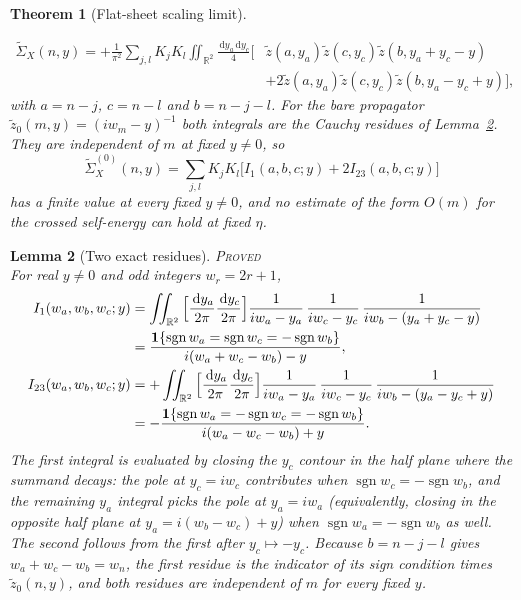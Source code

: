 \documentclass[11pt]{article}
\newcommand{\PROVED}{\upshape\mdseries\textsc{Proved}}
\newcommand{\dd}{\,\mathrm d}
\newtheorem{theorem}{Theorem}[section]
\newtheorem{lemma}[theorem]{Lemma}
\theoremstyle{definition}
\theoremstyle{remark}
\begin{document}
\begin{theorem}[Flat-sheet scaling limit]
\begin{enumerate}
\begin{equation}\label{eq:flatx}
\begin{aligned}
\tilde\Sigma_X(n,y)=+\frac{1}{\pi^2}\sum_{j,l}K_jK_l\iint_{\mathbb R^2}\frac{\dd y_a\dd y_c}{4}\Big[&\tilde z(a,y_a)\tilde z(c,y_c)\tilde z(b,y_a+y_c-y)\\
&+2\tilde z(a,y_a)\tilde z(c,y_c)\tilde z(b,y_a-y_c+y)\Big],
\end{aligned}
\end{equation}
with $a=n-j$, $c=n-l$ and $b=n-j-l$. For the bare propagator $\tilde z_0(m,y)=(iw_m-y)^{-1}$ both integrals are the Cauchy residues of Lemma~\ref{lem:residue}. They are independent of $m$ at fixed $y\ne0$, so
\begin{equation}\label{eq:flatx0}
\tilde\Sigma_X^{(0)}(n,y)=\sum_{j,l}K_jK_l\big[I_1(a,b,c;y)+2I_{23}(a,b,c;y)\big]
\end{equation}
has a finite value at every fixed $y\ne0$, and no estimate of the form $O(m)$ for the crossed self-energy can hold at fixed $\eta$.
\end{enumerate}
\end{theorem}

\begin{lemma}[Two exact residues]\label{lem:residue}\hfill\PROVED\\
For real $y\ne0$ and odd integers $w_r=2r+1$,
\begin{align}
I_1(w_a,w_b,w_c;y)&=\iint_{\mathbb R^2}\Big[\frac{\dd y_a}{2\pi}\frac{\dd y_c}{2\pi}\Big]\frac{1}{iw_a-y_a}\,\frac{1}{iw_c-y_c}\,\frac{1}{iw_b-(y_a+y_c-y)}\notag\\
&=\frac{\mathbf 1\{\operatorname{sgn}w_a=\operatorname{sgn}w_c=-\operatorname{sgn}w_b\}}{i(w_a+w_c-w_b)-y},\label{eq:I1}\\
I_{23}(w_a,w_b,w_c;y)&=+\iint_{\mathbb R^2}\Big[\frac{\dd y_a}{2\pi}\frac{\dd y_c}{2\pi}\Big]\frac{1}{iw_a-y_a}\,\frac{1}{iw_c-y_c}\,\frac{1}{iw_b-(y_a-y_c+y)}\notag\\
&=-\frac{\mathbf 1\{\operatorname{sgn}w_a=-\operatorname{sgn}w_c=-\operatorname{sgn}w_b\}}{i(w_a-w_c-w_b)+y}.\label{eq:I23}
\end{align}
The first integral is evaluated by closing the $y_c$ contour in the half plane where the summand decays: the pole at $y_c=iw_c$ contributes when $\operatorname{sgn}w_c=-\operatorname{sgn}w_b$, and the remaining $y_a$ integral picks the pole at $y_a=iw_a$ (equivalently, closing in the opposite half plane at $y_a=i(w_b-w_c)+y$) when $\operatorname{sgn}w_a=-\operatorname{sgn}w_b$ as well. The second follows from the first after $y_c\mapsto-y_c$. Because $b=n-j-l$ gives $w_a+w_c-w_b=w_n$, the first residue is the indicator of its sign condition times $\tilde z_0(n,y)$, and both residues are independent of $m$ for every fixed $y$.
\end{lemma}
\end{document}
